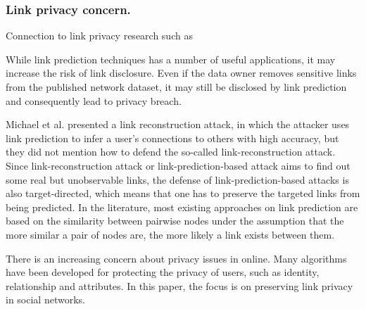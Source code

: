 \subsubsection{Link privacy concern.}

Connection to link privacy research such as \cite{amin:wwwj}

While link prediction techniques has a number of useful applications, it may increase the risk of link disclosure. Even if the data owner removes sensitive links from the published network dataset, it may still be disclosed by link prediction and consequently lead to privacy breach. 

Michael et al. \cite{fire2013links} presented a link reconstruction attack, in which the attacker uses link prediction to infer a user's connections to others with high accuracy, but they did not mention how to defend the so-called link-reconstruction attack. Since link-reconstruction attack or link-prediction-based attack aims to find out some real but unobservable links, the defense of link-prediction-based attacks is also target-directed, which means that one has to preserve the targeted links from being predicted. In the literature, most existing approaches on link prediction are based on the similarity between pairwise nodes under the assumption that the more similar a pair of nodes are, the more likely a link exists between them.

There is an increasing concern about privacy issues in online. Many algorithms have been developed for protecting the privacy of users, such as identity, relationship and attributes. In this paper, the focus is on preserving link privacy in social networks.


